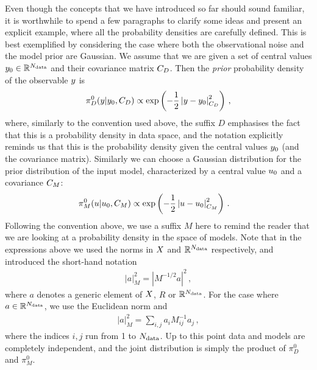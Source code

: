 Even though the concepts that we have introduced so far should sound familiar,
it is worthwhile to spend a few paragraphs to clarify some ideas and present an
explicit example, where all the probability densities are carefully defined.
This is best exemplified by considering the case where both the observational
noise and the model prior are Gaussian. We assume that we are given a set of
central values $y_0 \in \mathbb{R}^{N_{\rm data}}$ and their covariance matrix
$C_{D}$. Then the {\em prior} probability density of the observable
$y$ is 
\begin{equation}
  \label{eq:PriorData}
  \pi_{D}^0(y|y_0,C_{D}) \propto \exp\left(
    -\frac12 \left| y - y_0 \right|_{C_{D}}^2
    \right)\, ,
\end{equation}
where, similarly to the convention used above, the suffix $D$ emphasises the
fact that this is a probability density in data space, and the notation
explicitly reminds us that this is the probability density given the central
values $y_0$ (and the covariance matrix). Similarly we can choose a
Gaussian distribution for the prior distribution of the input model,
characterized by a central value $u_0$ and a covariance
$C_M$:
\begin{align}
  \label{eq:PiZeroGauss}
  \pi_{M}^0(u|u_0,C_M)  
  &\propto \exp\left(
              -\frac12 \left| u - u_0 \right|_{C_M}^2
              \right)\, .
\end{align}
Following the convention above, we use a suffix $M$ here to remind the reader
that we are looking at a probability density in the space of models. Note that
in the expressions above we used the norms in $X$ and $\mathbb{R}^{N_{\rm data}}$
respectively, and introduced the short-hand notation
\begin{align}
  \left|a\right|_M^2 = \left| M^{-1/2} a\right|^2\, ,
\end{align}
where $a$ denotes a generic element of $X$, $R$ or $\mathbb{R}^{N_{\rm data}}$.
For the case where $a \in \mathbb{R}^{N_{\rm data}}$, we use the Euclidean norm and
\begin{align}
  \left| a \right|_M^2 = \sum_{i,j} a_i M^{-1}_{ij} a_j\, ,
\end{align}
where the indices $i,j$ run from 1 to $N_{\rm data}$.  
Up to this point data and models are completely independent, and the joint
distribution is simply the product of $\pi_{D}^0$ and $\pi_{M}^0$. 

